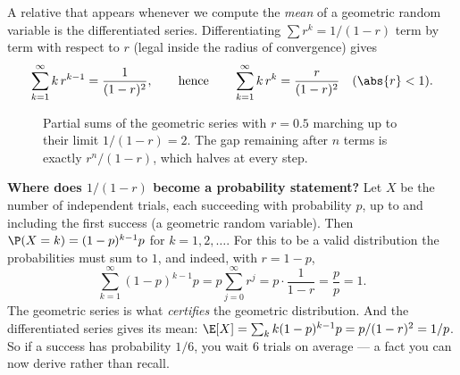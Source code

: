 A relative that appears whenever we compute the \emph{mean} of a geometric
random variable is the differentiated series. Differentiating $\sum r^k =
1/(1-r)$ term by term with respect to $r$ (legal inside the radius of
convergence) gives
\[
  \sum_{k=1}^{\infty} k\, r^{k-1} = \frac{1}{(1-r)^2}, \qquad\text{hence}\qquad
  \sum_{k=1}^{\infty} k\, r^{k} = \frac{r}{(1-r)^2} \quad (\abs{r}<1).
\]

\begin{figure}[H]
\centering
{}
\caption{Partial sums of the geometric series with $r = 0.5$ marching up to
their limit $1/(1-r) = 2$. The gap remaining after $n$ terms is exactly
$r^n/(1-r)$, which halves at every step.}
\label{ch39:geomfig}
\end{figure}

\begin{applicationbox}
\textbf{Where does $1/(1-r)$ become a probability statement?} Let $X$ be the
number of independent trials, each succeeding with probability $p$, up to and
including the first success (a geometric random variable). Then $\P(X = k) =
(1-p)^{k-1}p$ for $k = 1,2,\dots$. For this to be a valid distribution the
probabilities must sum to $1$, and indeed, with $r = 1-p$,
\[
  \sum_{k=1}^{\infty}(1-p)^{k-1}p = p\sum_{j=0}^{\infty} r^{j}
  = p\cdot\frac{1}{1-r} = \frac{p}{p} = 1.
\]
The geometric series is what \emph{certifies} the geometric distribution. And
the differentiated series gives its mean: $\E[X] = \sum_k k(1-p)^{k-1}p =
p/(1-r)^2 = 1/p$. So if a success has probability $1/6$, you wait $6$ trials on
average --- a fact you can now derive rather than recall.
\end{applicationbox}

